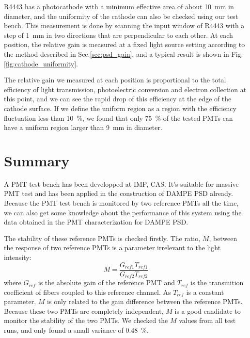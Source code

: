 \documentclass[5p, times]{elsarticle}
\begin{document}
R4443 has a photocathode with a minimum effective area of about \SI{10}{\milli\meter} in diameter, and the uniformity of the cathode can also be checked using our test bench.
This measurement is done by scanning the input window of R4443 with a step of \SI{1}{\milli\meter} in two directions that are perpendicular to each other.
At each position, the relative gain is measured at a fixed light source setting according to the method described in Sec.\ref{sec:psd_gain}, and a typical result is shown in Fig.\ref{fig:cathode_uniformity}.

The relative gain we measured at each position is proportional to the total efficiency of light transmission, photoelectric conversion and electron collection at this point, and we can see the rapid drop of this efficiency at the edge of the cathode surface. 
If we define the uniform region as a region with the efficiency fluctuation less than \SI{10}{\percent}, we found that only \SI{75}{\percent} of the tested PMTs can have a uniform region larger than \SI{9}{\milli\meter} in diameter. 

\section{Summary}
\label{sec:summary}

A PMT test bench has been developped at IMP, CAS. 
It's suitable for massive PMT test and has been applied in the construction of DAMPE PSD already.
Because the PMT test bench is monitored by two reference PMTs all the time, we can also get some knowledge about the performance of this system using the data obtained in the PMT characterization for DAMPE PSD.

The stability of these reference PMTs is checked firstly.
The ratio, $M$, between the response of two reference PMTs is a parameter irrelevant to the light intensity: 
\begin{equation}
 M = \frac{G_{ref1} T_{ref1}}{G_{ref2} T_{ref2}}
 \label{equ:stability}
\end{equation}
where $G_{ref}$ is the absolute gain of the reference PMT and $T_{ref}$ is the transmition coefficient of fibers coupled to this reference channel.
As $T_{ref}$ is a constant parameter, $M$ is only related to the gain difference between the reference PMTs.
Because these two PMTs are completely independent, $M$ is a good candidate to monitor the stability of the two PMTs. 
We checked the $M$ values from all test runs, and only found a small variance of \SI{0.48}{\percent}. 
\end{document}
